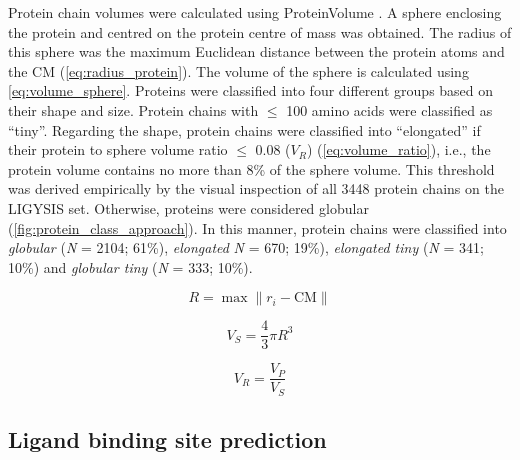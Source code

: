 Protein chain volumes were calculated using ProteinVolume \cite{CHEN_2015_PROTEINVOLUME}. A sphere enclosing the protein and centred on the protein centre of mass was obtained. The radius of this sphere was the maximum Euclidean distance between the protein atoms and the CM (\autoref{eq:radius_protein}). The volume of the sphere is calculated using \autoref{eq:volume_sphere}. Proteins were classified into four different groups based on their shape and size. Protein chains with $\leq$ 100 amino acids were classified as ``tiny''. Regarding the shape, protein chains were classified into ``elongated'' if their protein to sphere volume ratio $\leq$ 0.08 ($V_R$) (\autoref{eq:volume_ratio}), i.e., the protein volume contains no more than 8\% of the sphere volume. This threshold was derived empirically by the visual inspection of all 3448 protein chains on the LIGYSIS set. Otherwise, proteins were considered globular (\autoref{fig:protein_class_approach}). In this manner, protein chains were classified into \textit{globular} (\textit{N} = 2104; 61\%), \textit{elongated} \textit{N} = 670; 19\%), \textit{elongated tiny} (\textit{N} = 341; 10\%) and \textit{globular tiny} (\textit{N} = 333; 10\%).

\begin{equation}
R = \max \| r_i - \text{CM} \|
\label{eq:radius_protein}
\end{equation}

\vspace{-12pt} %

\begin{equation}
V_{S} = \frac{4}{3} \pi R^3
\label{eq:volume_sphere}
\end{equation}

\vspace{-12pt} %

\begin{equation}
V_R = \frac{V_{P}}{V_{S}}
\label{eq:volume_ratio}
\end{equation}


\subsection{Ligand binding site prediction}

